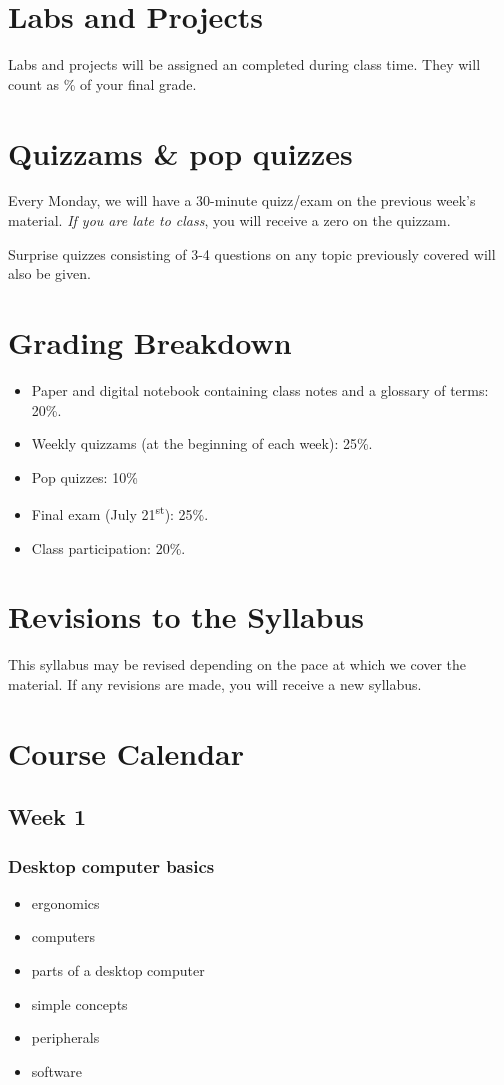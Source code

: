 \documentclass[11pt]{article}
\begin{document}
\section{Labs and Projects}

Labs and projects will be assigned an completed during class time.  They will count as \% of your final grade.


\section{Quizzams \& pop quizzes}

Every Monday, we will have a 30-minute quizz/exam on the previous week's material. \emph{If you are late to class}, you will receive a zero on the quizzam.

Surprise quizzes consisting of 3-4 questions on any topic previously covered will also be given.


\section{Grading Breakdown}

\begin{itemize}
\item Paper and digital notebook containing class notes and a glossary of terms: 20\%.
\item Weekly quizzams (at the beginning of each week): 25\%.
\item Pop quizzes: 10\%
\item Final exam (July 21\textsuperscript{st}): 25\%.
\item Class participation: 20\%.
\end{itemize}


\section{Revisions to the Syllabus}

This syllabus may be revised depending on the pace at which we cover the material. If any revisions are made, you will receive a new syllabus.


\section{Course Calendar}

\subsection*{Week 1}
\subsubsection*{Desktop computer basics}
\begin{itemize}
\item ergonomics
\item computers
\item parts of a desktop computer
\item simple concepts
\item peripherals
\item software
\end{itemize}
\end{document}
